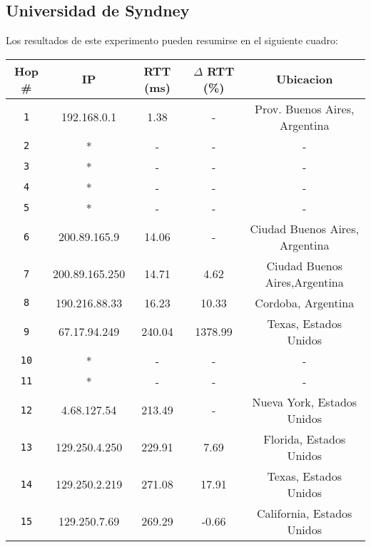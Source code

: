 \newpage

\subsection{Universidad de Syndney}

Los resultados de este experimento pueden resumirse en el siguiente cuadro:

\begin{table}[ht]\begin{center}
    \begin{tabular}{|c|c|c|c|c|}
    \hline
    \textbf{Hop \#} & \textbf{IP}& \textbf{RTT (ms)} & \textbf{$\Delta$ RTT (\%)} & \textbf{Ubicacion} \\ \hline
    \texttt{1} & 192.168.0.1      & 1.38    & -       & Prov. Buenos Aires, Argentina   \\ \hline
    \texttt{2} & *                & -       & -       & -   \\ \hline
    \texttt{3} & *                & -       & -       & -   \\ \hline
    \texttt{4} & *                & -       & -       & -   \\ \hline
    \texttt{5} & *                & -       & -       & -   \\ \hline
    \texttt{6} & 200.89.165.9     & 14.06   & -       & Ciudad Buenos Aires, Argentina    \\ \hline
    \texttt{7} & 200.89.165.250   & 14.71    & 4.62   & Ciudad Buenos Aires,Argentina   \\ \hline
    \texttt{8} & 190.216.88.33    & 16.23    & 10.33  & Cordoba, Argentina   \\ \hline
    \texttt{9} & 67.17.94.249     & 240.04  & 1378.99 & Texas, Estados Unidos   \\ \hline
    \texttt{10} & *               & -       & -       & -   \\ \hline
    \texttt{11} & *               & -       & -       & -    \\ \hline
    \texttt{12} & 4.68.127.54     & 213.49  & -       & Nueva York, Estados Unidos   \\ \hline
    \texttt{13} & 129.250.4.250   & 229.91  & 7.69    & Florida, Estados Unidos   \\ \hline
    \texttt{14} & 129.250.2.219   & 271.08  & 17.91   & Texas, Estados Unidos   \\ \hline
    \texttt{15} & 129.250.7.69    & 269.29  & -0.66   & California, Estados Unidos   \\ \hline

\end{tabular}
\end{center}
\end{table}
